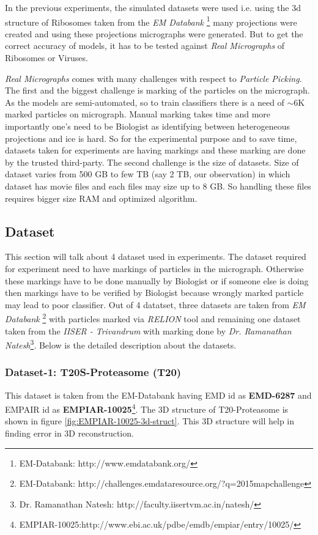 \documentclass[twoside]{iitbreport}
\begin{document}
In the previous experiments, the simulated datasets were used i.e. using the 3d structure of Ribosomes taken from the \textit{EM Databank} \footnote{\label{fn:emdatabank}EM-Databank: http://www.emdatabank.org/} many projections were created and using these projections micrographs were generated. But to get the correct accuracy of models, it has to be tested against \textit{Real Micrographs} of Ribosomes or Viruses. 

\textit{Real Micrographs} comes with many challenges with respect to \textit{Particle Picking}. The first and the biggest challenge is marking of the particles on the micrograph. As the models are semi-automated, so to train classifiers there is a need of $\sim$6K marked particles on micrograph. Manual marking takes time and more importantly one's need to be Biologist as identifying between heterogeneous projections and ice is hard. So for the experimental purpose and to save time, datasets taken for experiments are having markings and these marking are done by the trusted third-party. The second challenge is the size of datasets. Size of dataset varies from  500 GB to few TB (say 2 TB, our observation) in which dataset has movie files and each files may size up to 8 GB. So handling these files requires bigger size RAM and optimized algorithm.
\subsection{Dataset}
This section will talk about 4 dataset used in experiments. The dataset required for experiment need to have markings of particles in the micrograph. Otherwise these markings have to be done manually by Biologist or if someone else is doing then markings have to be verified by Biologist because wrongly marked particle may lead to poor classifier. Out of 4 datatset, three datasets are taken from \textit{EM Databank} \footnote{\label{fn:emdatabankchalange}EM-Databank: http://challenges.emdataresource.org/?q=2015\textunderscore map\textunderscore challenge} with particles marked via \textit{RELION} tool and remaining one dataset taken from the \textit{IISER - Trivandrum} with marking done by \textit{Dr. Ramanathan Natesh}\footnote{Dr. Ramanathan Natesh: http://faculty.iisertvm.ac.in/natesh/}. Below is the detailed description about the datasets.

\subsubsection{Dataset-1: T20S-Proteasome (T20)}\label{subsec:T20S-Proteasome}
This dataset is taken from the EM-Databank having EMD id as \textbf{EMD-6287} and EMPAIR id as \textbf{EMPIAR-10025}\footnote{\label{fn:EMPIAR-10025-3}EMPIAR-10025:http://www.ebi.ac.uk/pdbe/emdb/empiar/entry/10025/}. The 3D structure of T20-Proteasome is shown in figure \ref{fig:EMPIAR-10025-3d-struct}. This 3D structure will help in finding error in 3D reconstruction. 
\end{document}
